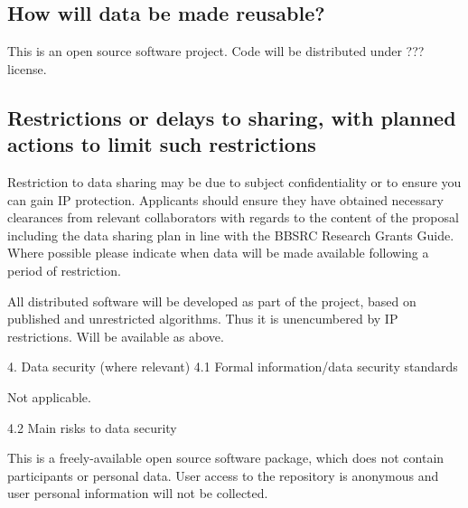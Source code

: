 \documentclass[a4paper,11pt]{article}
\begin{document}

\subsection{How will data be made reusable?}

This is an open source software project.  Code will be distributed under ??? license.



\subsection{Restrictions or delays to sharing, with planned actions to limit such restrictions} 
Restriction to data sharing may be due to subject confidentiality or to ensure you can gain IP protection. Applicants should ensure they have obtained necessary clearances from relevant collaborators with regards to the content of the proposal including the data sharing plan in line with the BBSRC Research Grants Guide. Where possible please indicate when data will be made available following a period of restriction.  

All distributed software will be developed as part of the project, based on published and unrestricted algorithms.  Thus it is unencumbered by IP restrictions.  Will be available as above.

4. Data security (where relevant)
4.1	Formal information/data security standards

Not applicable.

4.2	Main risks to data security

This is a freely-available open source software package, which does not contain participants or personal data.   User access to the repository is anonymous and user personal information will not be collected. 
\end{document}
